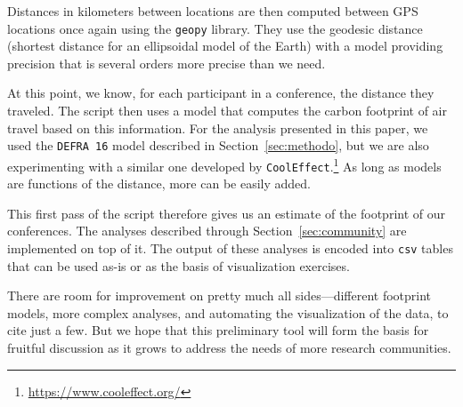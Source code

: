 Distances in kilometers between locations are then computed between GPS
locations once again using the \texttt{geopy} library. They use the geodesic
distance (shortest distance for an ellipsoidal model of the Earth) with a
model providing precision that is several orders more precise than we need.

At this point, we know, for each participant in a conference, the
distance they traveled. The script then uses a model that computes the
carbon footprint of air travel based on this information. For the analysis
presented in this paper, we used the \texttt{DEFRA 16} model described in
Section~\ref{sec:methodo}, but we are also experimenting with a similar one
developed by
\texttt{CoolEffect}.\footnote{\url{https://www.cooleffect.org/}}  As long as
models are functions of the distance, more can be easily added.

This first pass of the script therefore gives us an estimate of the
footprint of our conferences. The analyses described through Section~\ref{sec:community}
are implemented on top of it.
The output of these analyses is encoded into \texttt{csv} tables that can be
used as-is or as the basis of visualization exercises.

There are room for improvement on pretty much all sides---different
footprint models, more complex analyses, and automating the visualization of
the data, to cite just a few. But we hope that this preliminary tool will
form the basis for fruitful discussion as it grows to address the needs of
more research communities.
